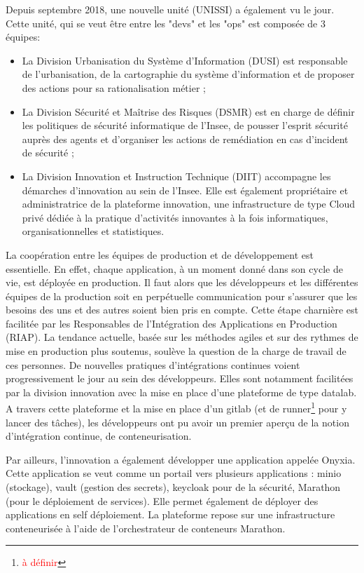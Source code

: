 \documentclass[11pt,fleqn]{book} %
\begin{document}
Depuis septembre 2018, une nouvelle unité (UNISSI) a également vu le jour. Cette unité, qui se veut être entre les "devs" et les "ops" est composée de 3 équipes: 
\begin{itemize}
    \item La Division Urbanisation du Système d’Information (DUSI) est responsable de l’urbanisation, de la cartographie du système d’information et de proposer des actions pour sa rationalisation métier ;
    \item La Division Sécurité et Maîtrise des Risques (DSMR) est en charge de définir les politiques de sécurité informatique de l’Insee, de pousser l’esprit sécurité auprès des agents et d’organiser les actions de remédiation en cas d’incident de sécurité ;
    \item La Division Innovation et Instruction Technique (DIIT) accompagne les démarches d’innovation au sein de l’Insee. Elle est également propriétaire et administratrice de la plateforme innovation, une infrastructure de type Cloud privé dédiée à la pratique d’activités innovantes à la fois informatiques, organisationnelles et statistiques.\\
\end{itemize}

La coopération entre les équipes de production et de développement est essentielle. En effet, chaque application, à un moment donné dans son cycle de vie, est déployée en production. Il faut alors que les développeurs et les différentes équipes de la production soit en perpétuelle communication pour s'assurer que les besoins des uns et des autres soient bien pris en compte. Cette étape charnière est facilitée par les Responsables de l’Intégration des Applications en Production (RIAP). La tendance actuelle, basée sur les méthodes agiles et sur des rythmes de mise en production plus soutenus,  soulève la question de la charge de travail de ces personnes. De nouvelles pratiques d'intégrations continues voient progressivement le jour au sein des développeurs. Elles sont notamment facilitées par la division innovation avec la mise en place d'une plateforme de type datalab.\\

A travers cette plateforme et la mise en place d'un gitlab (et de runner\footnote{\textcolor{red}{à définir}} pour y lancer des tâches), les développeurs ont pu avoir un premier aperçu de la notion d'intégration continue, de conteneurisation.\newline

Par ailleurs, l'innovation a également développer une application appelée Onyxia. Cette application se veut comme un portail vers plusieurs applications : minio (stockage), vault (gestion des secrets), keycloak pour de la sécurité, Marathon (pour le déploiement de services). Elle permet également de déployer des applications en self déploiement. La plateforme repose sur une infrastructure conteneurisée à l'aide de l'orchestrateur de conteneurs Marathon.  
\end{document}
